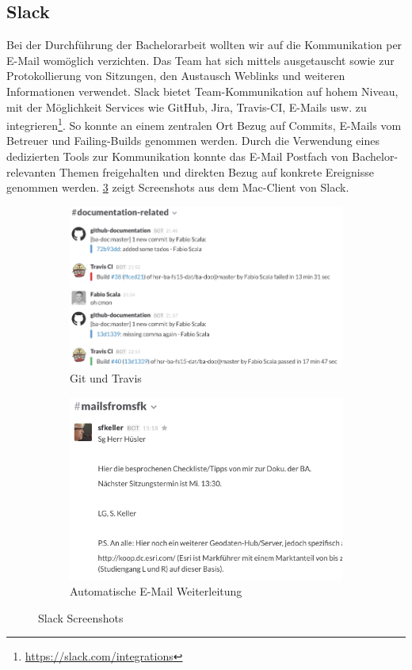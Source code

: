 \subsection{Slack}
Bei der Durchführung der Bachelorarbeit wollten wir auf die Kommunikation per E-Mail womöglich verzichten. Das Team hat sich mittels  ausgetauscht sowie zur Protokollierung von Sitzungen, den Austausch Weblinks und weiteren Informationen verwendet. Slack bietet Team-Kommunikation auf hohem Niveau, mit der Möglichkeit Services wie GitHub, Jira, Travis-CI, E-Mails usw. zu integrieren\footnote{\url{https://slack.com/integrations}}. So konnte an einem zentralen Ort Bezug auf Commits, E-Mails vom Betreuer und Failing-Builds genommen werden. Durch die Verwendung eines dedizierten Tools zur Kommunikation konnte das E-Mail Postfach von Bachelor-relevanten Themen freigehalten und direkten Bezug auf konkrete Ereignisse genommen werden. \cref{fig:pm:slack} zeigt Screenshots aus dem Mac-Client von Slack.

\begin{figure}[H]
	\centering
	\begin{subfigure}{0.49\textwidth}
		\centering
		\includegraphics[width=\linewidth]{fig/slack-git-travis}
		\caption{Git und Travis}
		\label{fig:pm:slack-git-travis}
	\end{subfigure}
	\begin{subfigure}{0.49\textwidth}
		\centering
		\includegraphics[width=\linewidth]{fig/slack-email}
		\caption{Automatische E-Mail Weiterleitung}
		\label{fig:pm:slack-email}
	\end{subfigure}
	\caption{Slack Screenshots}
	\label{fig:pm:slack}
\end{figure}

